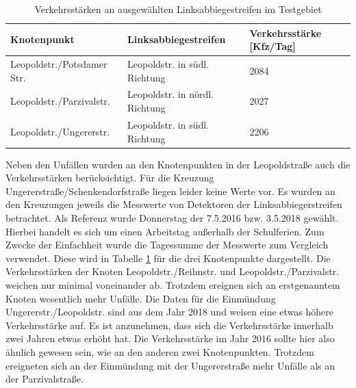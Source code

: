 \begin{table}[htpb]
	\scriptsize
	\caption[Verkehrsstärken an ausgewählten Linksabbiegestreifen im Testgebiet]{Verkehrsstärken an ausgewählten Linksabbiegestreifen im Testgebiet}\label{tab:Linksabbieger}
	\centering
	\begin{tabular}{l p{2.5cm} p{2cm} }
		\toprule
		Knotenpunkt & Linksabbiegestreifen & Verkehrsstärke [Kfz/Tag] \\
		\midrule
		Leopoldstr./Potsdamer Str. & Leopoldstr. in südl. Richtung & 2084 \\
		Leopoldstr./Parzivalstr. & Leopoldstr. in nördl. Richtung & 2027 \\
		Leopoldstr./Ungererstr. & Leopoldstr. in südl. Richtung & 2206 \\
		\bottomrule
	\end{tabular}
\end{table}

Neben den Unfällen wurden an den Knotenpunkten in der Leopoldstraße auch die Verkehrsstärken berücksichtigt. Für die Kreuzung Ungererstraße/Schenkendorfstraße liegen leider keine Werte vor. Es wurden an den Kreuzungen jeweils die Messwerte von Detektoren der Linksabbiegerstreifen betrachtet. Als Referenz wurde Donnerstag der 7.5.2016 bzw. 3.5.2018 gewählt. Hierbei handelt es sich um einen Arbeitstag außerhalb der Schulferien. Zum Zwecke der Einfachheit wurde die Tagessumme der Messwerte zum Vergleich verwendet. Diese wird in Tabelle \ref{tab:Linksabbieger} für die drei Knotenpunkte dargestellt. Die Verkehrsstärken der Knoten Leopoldstr./Reihnstr. und Leopoldstr./Parzivalstr. weichen nur minimal voneinander ab. Trotzdem ereignen sich an erstgenanntem Knoten wesentlich mehr Unfälle. Die Daten für die Einmündung Ungererstr./Leopoldstr. sind aus dem Jahr 2018 und weisen eine etwas höhere Verkehrsstärke auf. Es ist anzunehmen, dass sich die Verkehrsstärke innerhalb zwei Jahren etwas erhöht hat. Die Verkehrsstärke im Jahr 2016 sollte hier also ähnlich gewesen sein, wie an den anderen zwei Knotenpunkten. Trotzdem ereigneten sich an der Einmündung mit der Ungererstraße mehr Unfälle als an der Parzivalstraße. 

